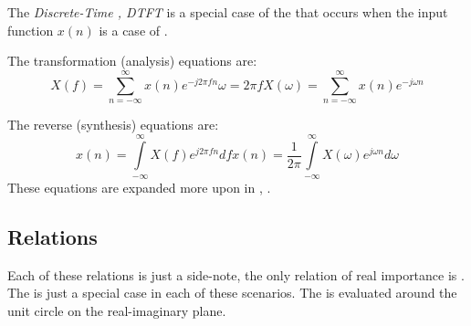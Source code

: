 \begin{definition}\label{def:Discrete-Time_Fourier_Transform}
  The \emph{Discrete-Time , DTFT} is a special case of the  that occurs when the input function $x(n)$ is a case of .

  The transformation (analysis) equations are:
  \begin{subequations}
    \begin{equation}\label{eq:Discrete-Time_Fourier_Transform-Analysis-Discrete-Frequency}
      X(f) = \sum\limits_{n=-\infty}^{\infty} x(n) e^{-j 2 \pi f n}
    \end{equation}
    \begin{equation*}
      \omega = 2 \pi f
    \end{equation*}
    \begin{equation}\label{eq:FourierTransform-Analysis-Discrete-Omega}
      X(\omega) = \sum\limits_{n=-\infty}^{\infty} x(n) e^{-j \omega n}
    \end{equation}
  \end{subequations}

  The reverse (synthesis) equations are:
  \begin{subequations}
    \begin{equation}\label{eq:InverseFourierTransform-Synthesis-Frequency}
      x(n) = \int\limits_{-\infty}^{\infty} X(f) e^{j 2\pi fn} df
    \end{equation}
    \begin{equation}\label{eq:InverseFourierTransform-Synthesis-Omega}
      x(n) = \frac{1}{2\pi} \int\limits_{-\infty}^{\infty} X(\omega) e^{j \omega n} d\omega
    \end{equation}
  \end{subequations}
  These equations are expanded more upon in , .
\end{definition}

\subsection{ Relations}\label{subsec:Fourier_Transform_Relations}
Each of these relations is just a side-note, the only relation of real importance is .
The  is just a special case in each of these scenarios.
The  is evaluated around the unit circle on the real-imaginary plane.

